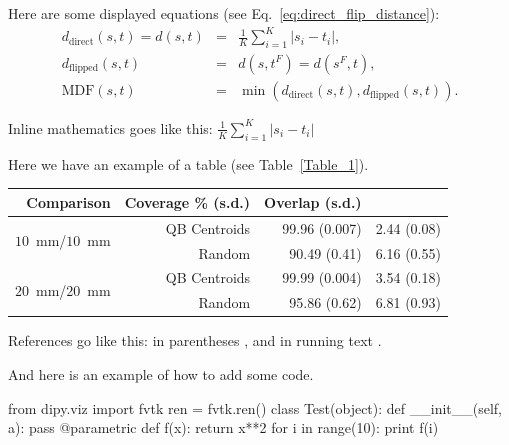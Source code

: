 \documentclass{bioinfo}
\begin{document}
Here are some displayed equations (see Eq.~\ref{eq:direct_flip_distance}):
\begin{eqnarray}
  d_{\textrm{direct}}(s, t) = d(s, t) & = & \frac{1}{K}\sum_{i=1}^{K}|s_{i}-t_{i}|,\nonumber\\
  d_{\textrm{flipped}}(s, t) & = & d(s,t^F) = d(s^F,t),\nonumber\\
  \textrm{MDF}(s, t) & = & \min(d_{\textrm{direct}}(s, t), d_{\textrm{flipped}}(s, t))\label{eq:direct_flip_distance}.
\end{eqnarray}

Inline mathematics goes like this: $\frac{1}{K}\sum_{i=1}^{K}|s_{i}-t_{i}|$

Here we have an example of a table (see Table~\ref{Table_1}).

\begin{table}[th]  {\begin{tabular}{rrrr} %
Comparison & Coverage \% (s.d.) & Overlap (s.d.) \\ \hline
\multirow{2}{*}{$10$~mm/$10$~mm} & QB Centroids & 99.96 (0.007) & 2.44
(0.08)\\ & Random & 90.49 (0.41) & 6.16 (0.55)\\ \hline
\multirow{2}{*}{$20$~mm/$20$~mm} & QB Centroids & 99.99 (0.004) & 3.54
(0.18)\\ & Random & 95.86 (0.62) & 6.81 (0.93)\\ \hline
\end{tabular}}{}
\end{table}

References go like this: in parentheses \citep{Garyfallidis_thesis, Mori1999}, and in running text \citet{Garyfallidis_thesis}.

And here is an example of how to add some code.

\begin{python}
from dipy.viz import fvtk
ren = fvtk.ren()
class Test(object):
  def __init__(self, a):
    pass
@parametric
def f(x):
  return x**2
for i in range(10):
  print f(i)
\end{python}



%

%
%
%
%

\end{document}
